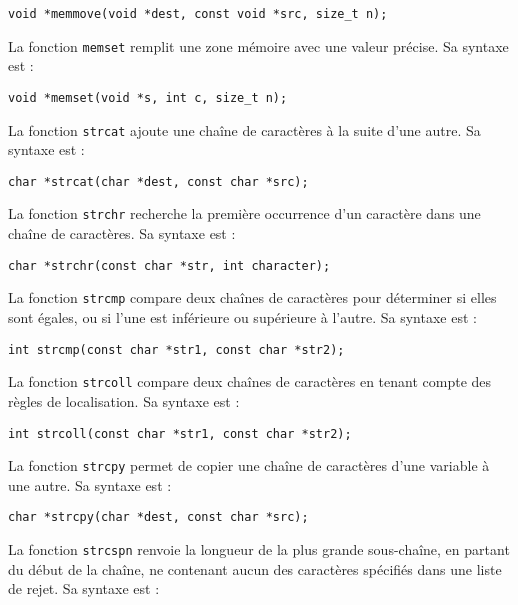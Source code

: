 \documentclass[french,11pt]{article}
\begin{document}
\begin{verbatim}
void *memmove(void *dest, const void *src, size_t n);
\end{verbatim}

La fonction \texttt{memset} remplit une zone mémoire avec une valeur précise. Sa syntaxe est :

\begin{verbatim}
void *memset(void *s, int c, size_t n);
\end{verbatim}

La fonction \texttt{strcat} ajoute une chaîne de caractères à la suite d'une autre. Sa syntaxe est :

\begin{verbatim}
char *strcat(char *dest, const char *src);
\end{verbatim}

La fonction \texttt{strchr} recherche la première occurrence d'un caractère dans une chaîne de caractères. Sa syntaxe est :

\begin{verbatim}
char *strchr(const char *str, int character);
\end{verbatim}

La fonction \texttt{strcmp} compare deux chaînes de caractères pour déterminer si elles sont égales, ou si l'une est inférieure ou supérieure à l'autre. Sa syntaxe est :

\begin{verbatim}
int strcmp(const char *str1, const char *str2);
\end{verbatim}

La fonction \texttt{strcoll} compare deux chaînes de caractères en tenant compte des règles de localisation. Sa syntaxe est :

\begin{verbatim}
int strcoll(const char *str1, const char *str2);
\end{verbatim}

La fonction \texttt{strcpy} permet de copier une chaîne de caractères d'une variable à une autre. Sa syntaxe est :

\begin{verbatim}
char *strcpy(char *dest, const char *src);
\end{verbatim}

La fonction \texttt{strcspn} renvoie la longueur de la plus grande sous-chaîne, en partant du début de la chaîne, ne contenant aucun des caractères spécifiés dans une liste de rejet. Sa syntaxe est :
\end{document}
